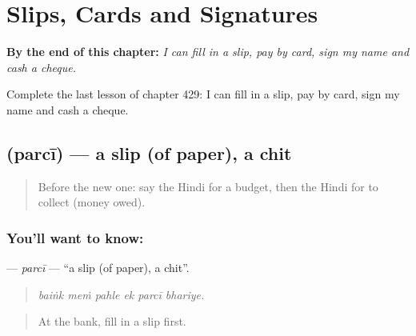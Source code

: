 
\chapter{Slips, Cards and Signatures}
\label{ch:hi-slips-cards-and-signatures}

\begin{chapteropening}
\textbf{By the end of this chapter:} \emph{I can fill in a slip, pay by card, sign my name and cash a cheque.}

Complete the last lesson of chapter 429: I can fill in a slip, pay by card, sign my name and cash a cheque.
\end{chapteropening}

\section[\texorpdfstring{\hi{पर्ची} (parcī)}{पर्ची (parcī)}]{ (parcī) — a slip (of paper), a chit}

\label{lesson:HI-C429-parci}



\begin{quote}
Before the new one: say the Hindi for a budget, then the Hindi for to collect (money owed).
\end{quote}

\subsection*{You'll want to know: }
\textbf{} — \emph{parcī} — \textquotedblleft{}a slip (of paper), a chit\textquotedblright{}.

\begin{quote}
     
\end{quote}

\begin{quote}
\emph{baiṅk meṁ pahle ek parcī bhariye.}
\end{quote}

\begin{quote}
At the bank, fill in a slip first.
\end{quote}

